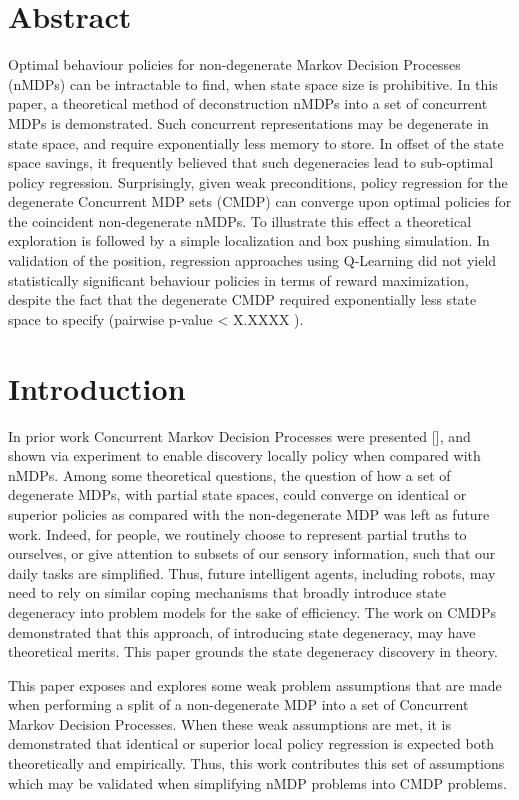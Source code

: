 \documentclass[]{article}
\date{}
\begin{document}
\section{Abstract}\label{abstract}

Optimal behaviour policies for non-degenerate Markov Decision Processes
(nMDPs) can be intractable to find, when state space size is
prohibitive. In this paper, a theoretical method of deconstruction nMDPs
into a set of concurrent MDPs is demonstrated. Such concurrent
representations may be degenerate in state space, and require
exponentially less memory to store. In offset of the state space
savings, it frequently believed that such degeneracies lead to
sub-optimal policy regression. Surprisingly, given weak preconditions,
policy regression for the degenerate Concurrent MDP sets (CMDP) can
converge upon optimal policies for the coincident non-degenerate nMDPs.
To illustrate this effect a theoretical exploration is followed by a
simple localization and box pushing simulation. In validation of the
position, regression approaches using Q-Learning did not yield
statistically significant behaviour policies in terms of reward
maximization, despite the fact that the degenerate CMDP required
exponentially less state space to specify (pairwise p-value \textless{}
X.XXXX ).

\section{Introduction}\label{introduction}

In prior work Concurrent Markov Decision Processes were presented
{[}{]}, and shown via experiment to enable discovery locally policy when
compared with nMDPs. Among some theoretical questions, the question of
how a set of degenerate MDPs, with partial state spaces, could converge
on identical or superior policies as compared with the non-degenerate
MDP was left as future work. Indeed, for people, we routinely choose to
represent partial truths to ourselves, or give attention to subsets of
our sensory information, such that our daily tasks are simplified. Thus,
future intelligent agents, including robots, may need to rely on similar
coping mechanisms that broadly introduce state degeneracy into problem
models for the sake of efficiency. The work on CMDPs demonstrated that
this approach, of introducing state degeneracy, may have theoretical
merits. This paper grounds the state degeneracy discovery in theory.

This paper exposes and explores some weak problem assumptions that are
made when performing a split of a non-degenerate MDP into a set of
Concurrent Markov Decision Processes. When these weak assumptions are
met, it is demonstrated that identical or superior local policy
regression is expected both theoretically and empirically. Thus, this
work contributes this set of assumptions which may be validated when
simplifying nMDP problems into CMDP problems.
\end{document}
